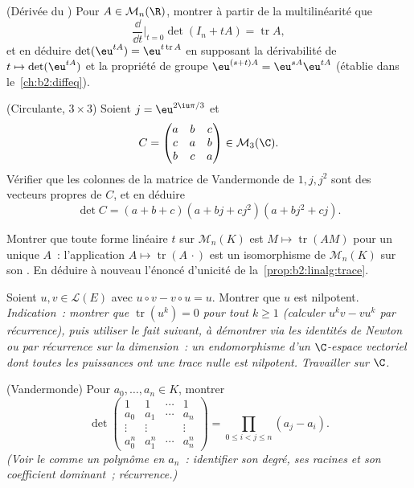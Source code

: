 \begin{exercise}[$\star\star$]\label{exo:b2:linalg:7}
(Dérivée du ) Pour $A \in \mathcal{M}_n(\R)$, montrer
à partir de la multilinéarité que
\[
\frac{\dd}{\dd t}\Big|_{t=0} \det(I_n + tA) = \operatorname{tr} A ,
\]
et en déduire $\det(\eu^{tA}) = \eu^{t\operatorname{tr} A}$ en supposant
la dérivabilité de $t \mapsto \det(\eu^{tA})$ et la propriété de groupe
$\eu^{(s+t)A} = \eu^{sA}\eu^{tA}$ (établie dans
le~\cref{ch:b2:diffeq}).
\end{exercise}

\begin{exercise}[$\star\star$]\label{exo:b2:linalg:8}
(Circulante, $3 \times 3$) Soient $j = \eu^{2\iu\pi/3}$ et
\[
C = \begin{pmatrix}
a & b & c\\
c & a & b\\
b & c & a
\end{pmatrix} \in \mathcal{M}_3(\C).
\]
Vérifier que les colonnes de la matrice de Vandermonde de $1, j, j^2$
sont des vecteurs propres de $C$, et en déduire
\[
\det C = (a + b + c)(a + bj + cj^2)(a + bj^2 + cj).
\]
\end{exercise}

\begin{exercise}[$\star\star\star$]\label{exo:b2:linalg:9}
Montrer que toute forme linéaire $t$ sur $\mathcal{M}_n(K)$ est $M \mapsto
\operatorname{tr}(AM)$ pour un unique $A$~: l'application $A \mapsto
\operatorname{tr}(A\,\cdot)$ est un isomorphisme de
$\mathcal{M}_n(K)$ sur son . En déduire à nouveau l'énoncé
d'unicité de la~\cref{prop:b2:linalg:trace}.
\end{exercise}

\begin{exercise}[$\star\star\star$]\label{exo:b2:linalg:10}
Soient $u, v \in \mathcal{L}(E)$ avec $u \circ v - v \circ u = u$.
Montrer que $u$ est nilpotent. \emph{Indication~: montrer que
$\operatorname{tr}(u^k) = 0$ pour tout $k \geq 1$ (calculer $u^k v -
v u^k$ par récurrence), puis utiliser le fait suivant, à démontrer via
les identités de Newton ou par récurrence sur la dimension~: un
endomorphisme d'un $\C$-espace vectoriel dont toutes les puissances ont
une trace nulle est nilpotent. Travailler sur $\C$.}
\end{exercise}

\begin{exercise}[$\star\star$]\label{exo:b2:linalg:11}
(Vandermonde) Pour $a_0, \dots, a_n \in K$, montrer
\[
\det\begin{pmatrix}
1 & 1 & \cdots & 1\\
a_0 & a_1 & \cdots & a_n\\
\vdots & \vdots & & \vdots\\
a_0^n & a_1^n & \cdots & a_n^n
\end{pmatrix}
= \prod_{0 \leq i < j \leq n} (a_j - a_i).
\]
\emph{(Voir le  comme un polynôme en $a_n$~: identifier son
degré, ses racines et son coefficient dominant~; récurrence.)}
\end{exercise}

